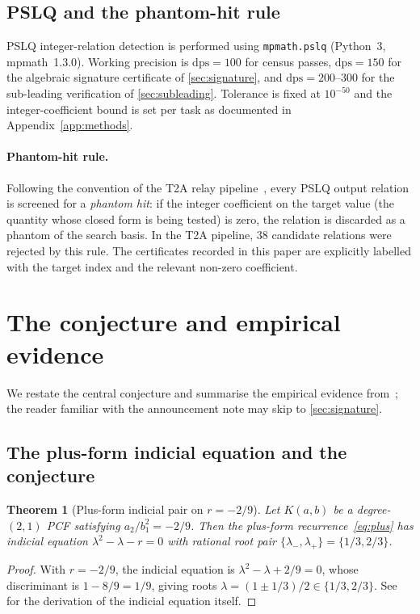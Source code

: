 \documentclass[11pt]{amsart}
\newtheorem{theorem}{Theorem}[section]
\theoremstyle{definition}
\theoremstyle{remark}
\newcommand{\dps}{\mathrm{dps}}
\begin{document}
\subsection{PSLQ and the phantom-hit rule}\label{sec:pslq}

PSLQ integer-relation detection is performed using
\texttt{mpmath.pslq} (Python~3, mpmath~1.3.0).  Working precision is
$\dps = 100$ for census passes, $\dps = 150$ for the algebraic
signature certificate of \textsection\ref{sec:signature}, and
$\dps = 200$--$300$ for the sub-leading verification of
\textsection\ref{sec:subleading}.  Tolerance is fixed at $10^{-50}$ and
the integer-coefficient bound is set per task as documented in
Appendix~\ref{app:methods}.

\paragraph{Phantom-hit rule.}
Following the convention of the T2A relay
pipeline~\cite{TRINote}, every PSLQ output relation is screened for a
\emph{phantom hit}: if the integer coefficient on the target value
(the quantity whose closed form is being tested) is zero, the relation
is discarded as a phantom of the search basis.  In the T2A pipeline,
$38$ candidate relations were rejected by this rule.  The certificates
recorded in this paper are explicitly labelled with the target index
and the relevant non-zero coefficient.

\section{The conjecture and empirical evidence}\label{sec:conjecture}

We restate the central conjecture and summarise the empirical evidence
from~\cite{TRINote}; the reader familiar with the announcement note
may skip to \textsection\ref{sec:signature}.

\subsection{The plus-form indicial equation and the conjecture}

\begin{theorem}[Plus-form indicial pair on $r=-2/9$]
\label{thm:plus-indicial}
Let $K(a,b)$ be a degree-$(2,1)$ PCF satisfying $a_2/b_1^2 = -2/9$.
Then the plus-form recurrence~\eqref{eq:plus} has indicial equation
$\lambda^2 - \lambda - r = 0$ with rational root pair
$\{\lambda_-,\lambda_+\} = \{1/3,2/3\}$.
\end{theorem}
\begin{proof}
With $r = -2/9$, the indicial equation is $\lambda^2 - \lambda + 2/9 =
0$, whose discriminant is $1 - 8/9 = 1/9$, giving roots
$\lambda = (1 \pm 1/3)/2 \in \{1/3, 2/3\}$.  See \cite[Lemma~2.2]%
{TRINote} for the derivation of the indicial equation itself.
\end{proof}
\end{document}
